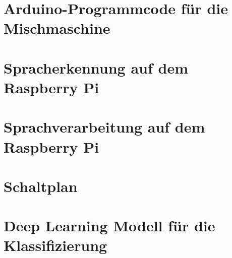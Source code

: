 \chapter{Arduino-Programmcode für die Mischmaschine}\label{Anhang_A}


\chapter{Spracherkennung auf dem Raspberry Pi}\label{Anhang_B}


\chapter{Sprachverarbeitung auf dem Raspberry Pi}\label{Anhang_C}


\chapter{Schaltplan}\label{Anhang_D}

\chapter{Deep Learning Modell für die Klassifizierung}\label{Anhang_E}
